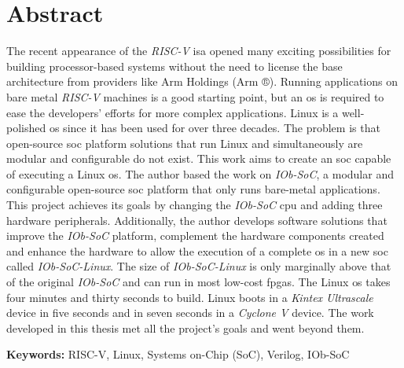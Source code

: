\cleardoubleoddpage

\chapter*{Abstract}
\thispagestyle{empty} %
The recent appearance of the \textit{RISC-V} \acrshort{isa} opened many exciting possibilities for building processor-based systems without the need to license the base architecture from providers like Arm Holdings (Arm ®). Running applications on bare metal \textit{RISC-V} machines is a good starting point, but an \acrshort{os} is required to ease the developers' efforts for more complex applications. Linux is a well-polished \acrshort{os} since it has been used for over three decades. The problem is that open-source \acrshort{soc} platform solutions that run Linux and simultaneously are modular and configurable do not exist.
This work aims to create an \acrshort{soc} capable of executing a Linux \acrshort{os}. The author based the work on \textit{IOb-SoC}, a modular and configurable open-source \acrshort{soc} platform that only runs bare-metal applications. This project achieves its goals by changing the \textit{IOb-SoC} \acrshort{cpu} and adding three hardware peripherals. Additionally, the author develops software solutions that improve the \textit{IOb-SoC} platform, complement the hardware components created and enhance the hardware to allow the execution of a complete \acrshort{os} in a new \acrshort{soc} called \textit{IOb-SoC-Linux}.
The size of \textit{IOb-SoC-Linux} is only marginally above that of the original \textit{IOb-SoC} and can run in most low-cost \acrshort{fpga}s. The Linux \acrshort{os} takes four minutes and thirty seconds to build. Linux boots in a \textit{Kintex Ultrascale} device in five seconds and in seven seconds in a \textit{Cyclone V} device. The work developed in this thesis met all the project's goals and went beyond them.


\vfill

\textbf{\Large Keywords:} RISC-V, Linux, Systems on-Chip (SoC), Verilog, IOb-SoC